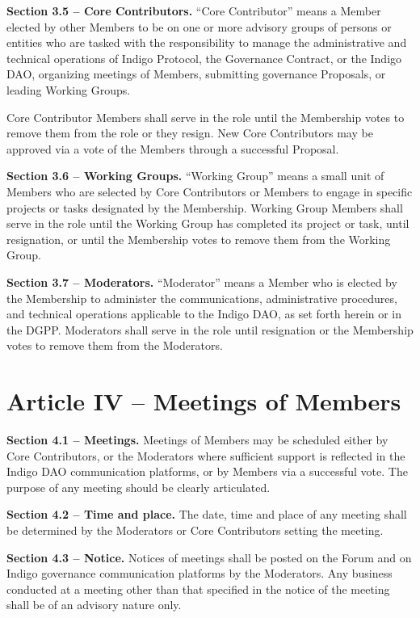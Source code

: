 \textbf{Section 3.5 -- Core Contributors.} ``Core Contributor'' means a
Member elected by other Members to be on one or more advisory groups of
persons or entities who are tasked with the responsibility to manage the
administrative and technical operations of Indigo Protocol, the
Governance Contract, or the Indigo DAO, organizing meetings of Members,
submitting governance Proposals, or leading Working Groups.

Core Contributor Members shall serve in the role until the Membership
votes to remove them from the role or they resign. New Core Contributors
may be approved via a vote of the Members through a successful Proposal.

\textbf{Section 3.6 -- Working Groups.} ``Working Group'' means a small
unit of Members who are selected by Core Contributors or Members to
engage in specific projects or tasks designated by the Membership.
Working Group Members shall serve in the role until the Working Group
has completed its project or task, until resignation, or until the
Membership votes to remove them from the Working Group.

\textbf{Section 3.7 -- Moderators.} ``Moderator'' means a Member who is
elected by the Membership to administer the communications,
administrative procedures, and technical operations applicable to the
Indigo DAO, as set forth herein or in the DGPP. Moderators shall serve
in the role until resignation or the Membership votes to remove them
from the Moderators.

\hypertarget{article-iv-meetings-of-members}{%
\section{Article IV -- Meetings of
Members}\label{article-iv-meetings-of-members}}

\textbf{Section 4.1 -- Meetings.} Meetings of Members may be scheduled
either by Core Contributors, or the Moderators where sufficient support
is reflected in the Indigo DAO communication platforms, or by Members
via a successful vote. The purpose of any meeting should be clearly
articulated.

\textbf{Section 4.2 -- Time and place.} The date, time and place of any
meeting shall be determined by the Moderators or Core Contributors
setting the meeting.

\textbf{Section 4.3 -- Notice.} Notices of meetings shall be posted on
the Forum and on Indigo governance communication platforms by the
Moderators. Any business conducted at a meeting other than that
specified in the notice of the meeting shall be of an advisory nature
only.

